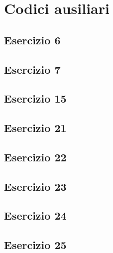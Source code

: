 \section{Codici ausiliari}

\subsection{Esercizio 6}


\subsection{Esercizio 7}


\subsection{Esercizio 15}


\subsection{Esercizio 21}


\subsection{Esercizio 22}


\subsection{Esercizio 23}


\subsection{Esercizio 24}


\subsection{Esercizio 25}

